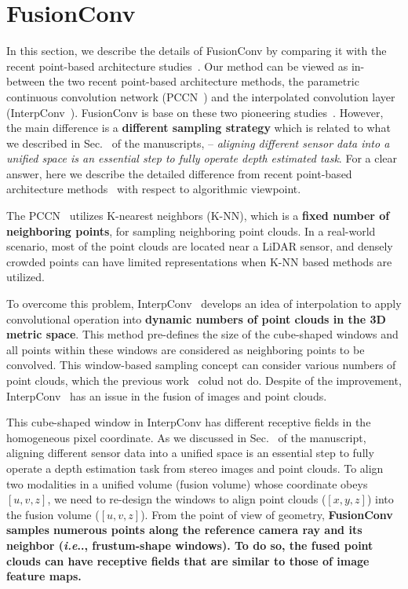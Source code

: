 \documentclass[letterpaper, 10 pt, conference]{ieeeconf}
\makeatletter
\DeclareRobustCommand\onedot{\futurelet\@let@token\@onedot}
\def\@onedot{\ifx\@let@token.\else.\null\fi\xspace}
\def\ie{\emph{i.e}\onedot} \def\Ie{{I.e}\onedot}
\newcommand{\RNum}[1]{\uppercase\expandafter{\romannumeral #1\relax}}
\makeatother
\begin{document}
\section{FusionConv}
\label{supp-sec:FusionConv}
In this section, we describe the details of FusionConv by comparing it with the recent point-based architecture studies~\cite{continuous_conv,dynamic_graph_conv,interp_conv,pointnet}. Our method can be viewed as in-between the two recent point-based architecture methods, the parametric continuous convolution network (PCCN~\cite{continuous_conv}) and the interpolated convolution layer (InterpConv~\cite{interp_conv}). FusionConv is base on these two pioneering studies~\cite{continuous_conv,interp_conv}. However, the main difference is a \textbf{different sampling strategy} which is related to what we described in Sec.~\textcolor{red}{\RNum{1}} of the manuscripts, -- \textit{aligning different sensor data into a unified space is an essential step to fully operate depth estimated task}. For a clear answer, here we describe the detailed difference from recent point-based architecture methods~\cite{continuous_conv,interp_conv} with respect to algorithmic viewpoint.

The PCCN~\cite{continuous_conv} utilizes K-nearest neighbors (K-NN), which is a \textbf{fixed number of neighboring points}, for sampling neighboring point clouds. In a real-world scenario, most of the point clouds are located near a LiDAR sensor, and densely crowded points can have limited representations when K-NN based methods are utilized.

To overcome this problem, InterpConv~\cite{interp_conv} develops an idea of interpolation to apply convolutional operation into \textbf{dynamic numbers of point clouds in the 3D metric space}. This method pre-defines the size of the cube-shaped windows and all points within these windows are considered as neighboring points to be convolved. This window-based sampling concept can consider various numbers of point clouds, which the previous work~\cite{continuous_conv} colud not do. Despite of the improvement, InterpConv~\cite{interp_conv} has an issue in the fusion of images and point clouds. 

This cube-shaped window in InterpConv has different receptive fields in the homogeneous pixel coordinate. As we discussed in Sec.~\textcolor{red}{\RNum{1}} of the manuscript, aligning different sensor data into a unified space is an essential step to fully operate a depth estimation task from stereo images and point clouds. To align two modalities in a unified volume (fusion volume) whose coordinate obeys $[u,v,z]$, we need to re-design the windows to align point clouds ($[x,y,z]$) into the fusion volume ($[u,v,z]$). From the point of view of geometry, \textbf{FusionConv samples numerous points along the reference camera ray and its neighbor (\ie, frustum-shape windows). To do so, the fused point clouds can have receptive fields that are similar to those of image feature maps.}
\end{document}
